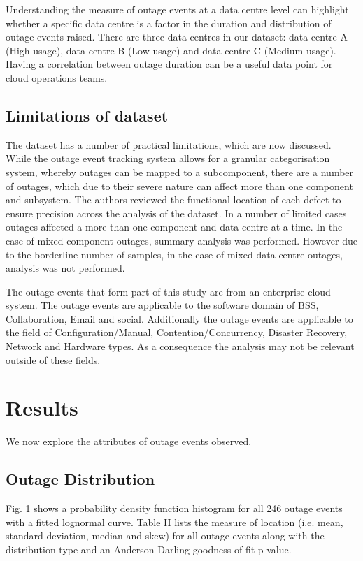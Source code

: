 \documentclass[conference]{IEEEtran}
\begin{document}
Understanding the measure of outage events at a data centre level can highlight whether a specific data centre is a factor in the duration and distribution of outage events raised. There are three data centres in our dataset: data centre A (High usage), data centre B (Low usage) and data centre C (Medium usage). Having a correlation between outage duration can be a useful data point for cloud operations teams.

\subsection{Limitations of dataset}

The dataset has a number of practical limitations, which are now discussed. While the outage event tracking system allows for a granular categorisation system, whereby outages can be mapped to a subcomponent, there are a number of outages, which due to their severe nature can affect more than one component and subsystem. The authors reviewed the functional location of each defect to ensure precision across the analysis of the dataset. In a number of limited cases outages affected a more than one component and data centre at a time. In the case of mixed component outages, summary analysis was performed. However due to the borderline number of samples, in the case of mixed data centre outages, analysis was not performed. \par

The outage events that form part of this study are from an enterprise cloud system. The outage events are applicable to the software domain of BSS, Collaboration, Email and social. Additionally the outage events are applicable to the field of Configuration/Manual, Contention/Concurrency, Disaster Recovery, Network and Hardware types. As a consequence the analysis may not be relevant outside of these fields. 

\section{Results}

We now explore the attributes of outage events observed.

\subsection{Outage Distribution}

Fig. 1 shows a probability density function histogram for all 246 outage events with a fitted lognormal curve. 
Table II lists the measure of location (i.e. mean, standard deviation, median and skew) for all outage events along with the distribution type and an Anderson-Darling goodness of fit p-value.
\end{document}
